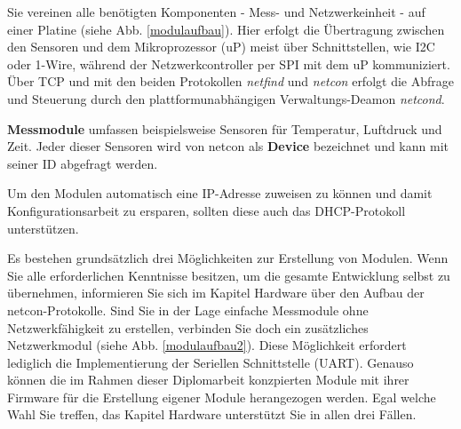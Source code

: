 \documentclass[a4paper,14pt,headsepline]{scrartcl}
\begin{document}
\newpage

Sie vereinen alle benötigten Komponenten - Mess- und Netzwerkeinheit - auf einer Platine (siehe Abb. \ref{modulaufbau}). Hier erfolgt die Übertragung zwischen den Sensoren und dem Mikroprozessor (uP) meist über Schnittstellen, wie I2C oder 1-Wire, während der Netzwerkcontroller per SPI mit dem uP kommuniziert. Über TCP und mit den beiden Protokollen \textit{netfind} und \textit{netcon} erfolgt die Abfrage und Steuerung durch den plattformunabhängigen Verwaltungs-Deamon \textit{netcond}. 

\textbf{Messmodule} umfassen beispielsweise Sensoren für Temperatur, Luftdruck und Zeit. Jeder dieser Sensoren wird von netcon als \textbf{Device} bezeichnet und kann mit seiner ID abgefragt werden.

Um den Modulen automatisch eine IP-Adresse zuweisen zu können und damit Konfigurationsarbeit zu ersparen, sollten diese auch das DHCP-Protokoll unterstützen.

Es bestehen grundsätzlich drei Möglichkeiten zur Erstellung von Modulen. Wenn Sie alle erforderlichen Kenntnisse besitzen, um die gesamte Entwicklung selbst zu übernehmen, informieren Sie sich im Kapitel Hardware über den Aufbau der netcon-Protokolle. Sind Sie in der Lage einfache Messmodule ohne Netzwerkfähigkeit zu erstellen, verbinden Sie doch ein zusätzliches Netzwerkmodul (siehe Abb. \ref{modulaufbau2}). Diese Möglichkeit erfordert lediglich die Implementierung der Seriellen Schnittstelle (UART). Genauso können die im Rahmen dieser Diplomarbeit konzpierten Module mit ihrer Firmware für die Erstellung eigener Module herangezogen werden. Egal welche Wahl Sie treffen, das Kapitel Hardware unterstützt Sie in allen drei Fällen.

\begin{figure}[h]
\begin{center}
\end{center}
\end{figure}
\end{document}
